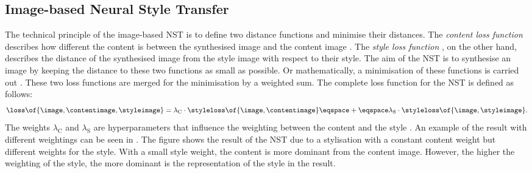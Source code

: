 \subsection{Image-based Neural Style Transfer}
The technical principle of the image-based \gls{NST} is to define two distance functions and minimise their distances. The \emph{content loss function} \contentloss{} describes how different the content is between the synthesised image \image{} and the content image \contentimage{}. The \emph{style loss function} \styleloss{}, on the other hand, describes the distance of the synthesised image \image{} from the style image \styleimage{} with respect to their style. The aim of the \gls{NST} is to synthesise an image by keeping the distance to these two functions as small as possible. Or mathematically, a minimisation of these functions is carried out \cite{Glas2021}. These two loss functions are merged for the minimisation by a weighted sum. The complete loss function \loss{} for the \gls{NST} is defined as follows:
\begin{equation*}
	\loss\of{\image\eqcommasep \contentimage\eqcommasep \styleimage} = \lambda_\text{C} \cdot \styleloss\of{\image\eqcommasep \contentimage} \eqspace+\eqspace \lambda_\text{S} \cdot \styleloss\of{\image\eqcommasep \styleimage} \eqtextdot
\end{equation*}
The weights $\lambda_\text{C}$ and $\lambda_\text{S}$ are hyperparameters that influence the weighting between the content and the style \cite{GEB2016}. An example of the result with different weightings can be seen in . The figure shows the result of the \gls{NST} due to a stylisation with a constant content weight but different weights for the style. With a small style weight, the content is more dominant from the content image. However, the higher the weighting of the style, the more dominant is the representation of the style in the result.
